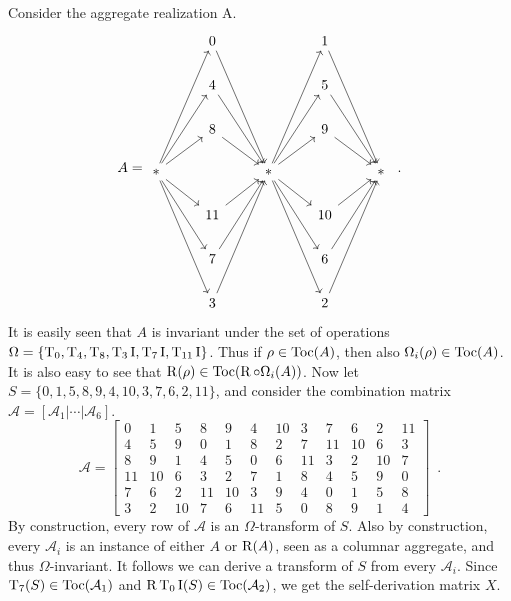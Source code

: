 \begin{example}
    \label{ex:stingray}
    Consider the aggregate realization A.
    \begin{equation}
        A = \begin{tikzcd}
            & 0 \arrow[dddr] && 1 \arrow[dddr] & \\
            & 4 \arrow[ddr] && 5 \arrow[ddr] & \\
            & 8 \arrow[dr] && 9 \arrow[dr] & \\
            * \arrow[ur] \arrow[uur] \arrow[uuur] \arrow[dr] \arrow[ddr] \arrow[dddr] && * \arrow[ur] \arrow[uur] \arrow[uuur] \arrow[dr] \arrow[ddr] \arrow[dddr] && * \\
            & 11 \arrow[ur] && 10 \arrow[ur] & \\
            & 7 \arrow[uur] && 6 \arrow[uur] & \\
            & 3 \arrow[uuur] && 2 \arrow[uuur] &
        \end{tikzcd} \enspace.
    \end{equation}
    It is easily seen that $A$ is invariant under the set of operations $\Omega = \{ \operatorname{T}_0, \operatorname{T}_4, \operatorname{T}_8, \operatorname{T}_3\operatorname{I}, \operatorname{T}_7\operatorname{I}, \operatorname{T}_{11}\operatorname{I} \}$. Thus if $\rho \in \operatorname{Toc}(A)$, then also $\Omega_i(\rho) \in \operatorname{Toc}(A)$. It is also easy to see that $\operatorname{R}(\rho) \in \operatorname{Toc}(\operatorname{R} \circ \Omega_i(A))$. Now let $S = \{ 0, 1, 5, 8, 9, 4, 10, 3, 7, 6, 2, 11 \}$, and consider the combination matrix $\mathcal{A} = [\mathcal{A}_1 | \cdots | \mathcal{A}_6]$.
    \begin{equation}
        \mathcal{A} = \left[
        \begin{array}{cc|cc|cc|cc|cc|cc}
            0 & 1 & 5 & 8 & 9 & 4 & 10 & 3 & 7 & 6 & 2 & 11 \\
            4 & 5 & 9 & 0 & 1 & 8 & 2 & 7 & 11 & 10 & 6 & 3 \\
            8 & 9 & 1 & 4 & 5 & 0 & 6 & 11 & 3 & 2 & 10 & 7 \\
            11 & 10 & 6 & 3 & 2 & 7 & 1 & 8 & 4 & 5 & 9 & 0 \\
            7 & 6 & 2 & 11 & 10 & 3 & 9 & 4 & 0 & 1 & 5 & 8 \\
            3 & 2 & 10 & 7 & 6 & 11 & 5 & 0 & 8 & 9 & 1 & 4
        \end{array}
        \right] \enspace.
    \end{equation}
    By construction, every row of $\mathcal{A}$ is an $\Omega$-transform of $S$. Also by construction, every $\mathcal{A}_i$ is an instance of either $A$ or $\operatorname{R}(A)$, seen as a columnar aggregate, and thus $\Omega$-invariant. It follows we can derive a transform of $S$ from every $\mathcal{A}_i$. Since $\operatorname{T}_7(S) \in \operatorname{Toc}(\mathcal{A}_1)$ and $\operatorname{R}\operatorname{T}_0\operatorname{I}(S) \in \operatorname{Toc}(\mathcal{A}_2)$, we get the self-derivation matrix $X$.

\end{example}

